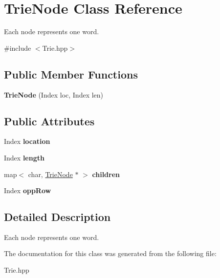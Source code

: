 \hypertarget{class_trie_node}{\section{\-Trie\-Node \-Class \-Reference}
\label{class_trie_node}
}


\-Each node represents one word.  




{\ttfamily \#include $<$\-Trie.\-hpp$>$}

\subsection*{\-Public \-Member \-Functions}
\begin{DoxyCompactItemize}
\item 
\hypertarget{class_trie_node_a2908d7b57e6a14ae8c8937916c2e092b}{{\bfseries \-Trie\-Node} (\-Index loc, \-Index len)}\label{class_trie_node_a2908d7b57e6a14ae8c8937916c2e092b}

\end{DoxyCompactItemize}
\subsection*{\-Public \-Attributes}
\begin{DoxyCompactItemize}
\item 
\hypertarget{class_trie_node_a8240d44444736e98c7985f3d3009a95a}{\-Index {\bfseries location}}\label{class_trie_node_a8240d44444736e98c7985f3d3009a95a}

\item 
\hypertarget{class_trie_node_ad1b12493acb682356c589f401c7e0498}{\-Index {\bfseries length}}\label{class_trie_node_ad1b12493acb682356c589f401c7e0498}

\item 
\hypertarget{class_trie_node_a4f296aac60bfb1db802ab57b2bf1221c}{map$<$ char, \hyperlink{class_trie_node}{\-Trie\-Node} $\ast$ $>$ {\bfseries children}}\label{class_trie_node_a4f296aac60bfb1db802ab57b2bf1221c}

\item 
\hypertarget{class_trie_node_aa55e396378df5f1945904ebf0e859b6a}{\-Index {\bfseries opp\-Row}}\label{class_trie_node_aa55e396378df5f1945904ebf0e859b6a}

\end{DoxyCompactItemize}


\subsection{\-Detailed \-Description}
\-Each node represents one word. 

\-The documentation for this class was generated from the following file\-:\begin{DoxyCompactItemize}
\item 
\-Trie.\-hpp\end{DoxyCompactItemize}
